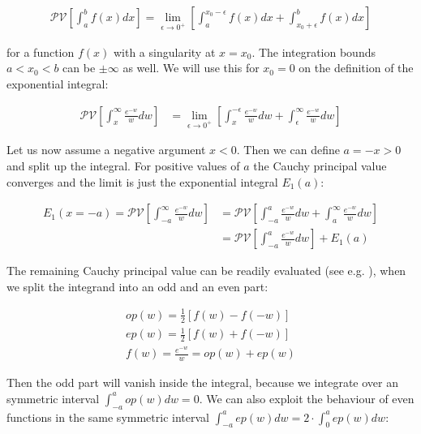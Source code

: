\documentclass[bibliography=totocnumbered]{scrartcl}
\begin{document}
	\begin{gather}
		\mathcal{PV}\left[\int_{a}^{b}f\left(x\right)dx\right]=\lim_{\epsilon\to{}0^{+}}\left[\int_{a}^{x_0-\epsilon}f\left(x\right)dx+\int_{x_0+\epsilon}^{b}f\left(x\right)dx\right]
	\end{gather}

	for a function $f\left(x\right)$ with a singularity at $x=x_0$. The integration bounds $a<x_0<b$ can be $\pm\infty$ as well. We will use this for $x_0=0$ on the definition of the exponential integral:

	\begin{align}
		\mathcal{PV}\left[\int_{x}^{\infty}\frac{e^{-w}}{w}dw\right]&=\lim_{\epsilon\to{}0^{+}}\left[\int_{x}^{-\epsilon}\frac{e^{-w}}{w}dw+\int_{\epsilon}^{\infty}\frac{e^{-w}}{w}dw\right]
	\end{align}

	Let us now assume a negative argument $x<0$. Then we can define $a=-x>0$ and split up the integral. For positive values of $a$ the Cauchy principal value converges and the limit is just the exponential integral $E_1\left(a\right)$:

	\begin{align}
		E_1\left(x=-a\right)=\mathcal{PV}\left[\int_{-a}^{\infty}\frac{e^{-w}}{w}dw\right]&=\mathcal{PV}\left[\int_{-a}^{a}\frac{e^{-w}}{w}dw+\int_{a}^{\infty}\frac{e^{-w}}{w}dw\right]\\
		&=\mathcal{PV}\left[\int_{-a}^{a}\frac{e^{-w}}{w}dw\right]+E_1\left(a\right)
	\end{align}

	The remaining Cauchy principal value can be readily evaluated (see e.g. \cite{rabinowitz}), when we split the integrand into an odd and an even part:

	\begin{gather}
		op\left(w\right)=\frac{1}{2}\left[f\left(w\right)-f\left(-w\right)\right]\\
		ep\left(w\right)=\frac{1}{2}\left[f\left(w\right)+f\left(-w\right)\right]\\
		f\left(w\right)=\frac{e^{-w}}{w}=op\left(w\right)+ep\left(w\right)
	\end{gather}

	Then the odd part will vanish inside the integral, because we integrate over an symmetric interval $\int_{-a}^{a}op\left(w\right)dw=0$. We can also exploit the behaviour of even functions in the same symmetric interval $\int_{-a}^{a}ep\left(w\right)dw=2\cdot\int_{0}^{a}ep\left(w\right)dw$:
\end{document}
